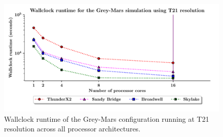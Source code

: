 \documentclass[a4paper,11pt]{report}
\begin{document}
\begin{figure}[htbp]
\begin{center}
\includegraphics[width=1\linewidth]{img/scaling_graph_T21_Grey_mars.pdf}
\caption[Wallclock runtime of the Grey-Mars configuration running at T21 resolution]{Wallclock runtime of the Grey-Mars configuration running at T21 resolution across all processor architectures.}
\label{fig:t21-scale-grey}
\end{center}
\end{figure}
\newpage
\end{document}
